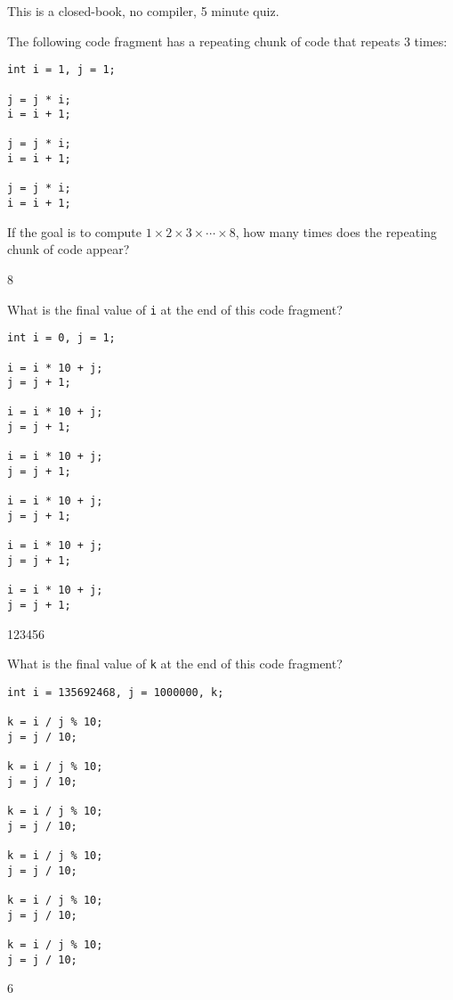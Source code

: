 

This is a closed-book, no compiler, 5 minute quiz.

\nextq
The following code fragment has a repeating chunk of code that repeats
3 times:
\begin{Verbatim}[fontsize=\footnotesize,frame=single,commandchars=\\\{\}]
int i = 1, j = 1;

j = j * i;
i = i + 1;

j = j * i;
i = i + 1;

j = j * i;
i = i + 1;
\end{Verbatim}
If the goal is to compute $1 \times 2 \times 3 \times \cdots \times 8$,
how many times does the repeating chunk of code appear?
\\
\ANSWER
\begin{answercode}
8
\end{answercode}

\nextq
What is the final value of \verb!i! at the end of this code fragment?
\begin{Verbatim}[fontsize=\footnotesize,frame=single]
int i = 0, j = 1;

i = i * 10 + j;
j = j + 1;

i = i * 10 + j;
j = j + 1;

i = i * 10 + j;
j = j + 1;

i = i * 10 + j;
j = j + 1;

i = i * 10 + j;
j = j + 1;

i = i * 10 + j;
j = j + 1;
\end{Verbatim}
\ANSWER
\begin{answercode}
123456
\end{answercode}

\nextq
What is the final value of \verb!k! at the end of this code fragment?
\begin{Verbatim}[fontsize=\footnotesize,frame=single]
int i = 135692468, j = 1000000, k;

k = i / j % 10;
j = j / 10;

k = i / j % 10;
j = j / 10;

k = i / j % 10;
j = j / 10;

k = i / j % 10;
j = j / 10;

k = i / j % 10;
j = j / 10;

k = i / j % 10;
j = j / 10;
\end{Verbatim}
\ANSWER
\begin{answercode}
6
\end{answercode}

